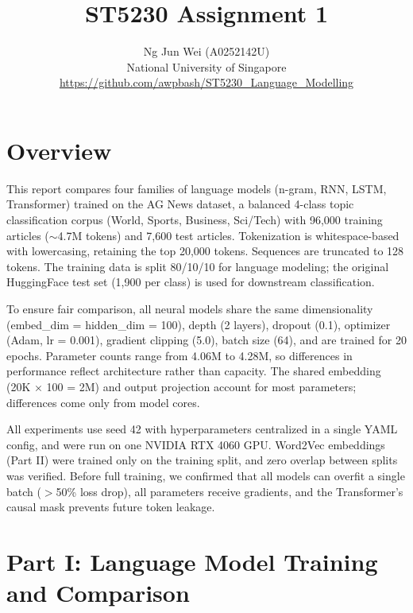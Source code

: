 \documentclass[11pt,a4paper]{article}
\title{\textbf{ST5230 Assignment 1}}
\author{Ng Jun Wei (A0252142U)\\National University of Singapore\\\url{https://github.com/awpbash/ST5230_Language_Modelling}}
\date{}
\begin{document}
\maketitle
\vspace{-2em}

\section{Overview}

This report compares four families of language models (n-gram, RNN, LSTM, Transformer) trained on the AG News dataset, a balanced 4-class topic classification corpus (World, Sports, Business, Sci/Tech) with 96,000 training articles ($\sim$4.7M tokens) and 7,600 test articles. Tokenization is whitespace-based with lowercasing, retaining the top 20,000 tokens. Sequences are truncated to 128 tokens. The training data is split 80/10/10 for language modeling; the original HuggingFace test set (1,900 per class) is used for downstream classification.

To ensure fair comparison, all neural models share the same dimensionality (embed\_dim = hidden\_dim = 100), depth (2 layers), dropout (0.1), optimizer (Adam, lr = 0.001), gradient clipping (5.0), batch size (64), and are trained for 20 epochs. Parameter counts range from 4.06M to 4.28M, so differences in performance reflect architecture rather than capacity. The shared embedding (20K $\times$ 100 = 2M) and output projection account for most parameters; differences come only from model cores.

All experiments use seed 42 with hyperparameters centralized in a single YAML config, and were run on one NVIDIA RTX 4060 GPU. Word2Vec embeddings (Part II) were trained only on the training split, and zero overlap between splits was verified. Before full training, we confirmed that all models can overfit a single batch ($>$50\% loss drop), all parameters receive gradients, and the Transformer's causal mask prevents future token leakage.

\section{Part I: Language Model Training and Comparison}
\end{document}
